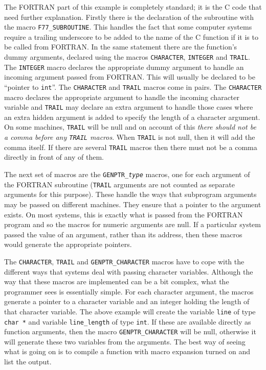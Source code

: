 \documentclass[twoside,11pt,nolof]{starlink}
\begin{document}
The FORTRAN part of this example is completely standard; it is the C code that
need further explanation. Firstly there is the declaration of the subroutine
with the macro \texttt{F77\_SUBROUTINE}\@.
This handles the fact that some computer
systems require a trailing underscore to be added to the name of the C function
if it is to be called from FORTRAN\@. In the same statement there are the
function's dummy arguments, declared using the macros \texttt{CHARACTER},
\texttt{INTEGER} and \texttt{TRAIL}\@.
The \texttt{INTEGER} macro declares the appropriate dummy argument to handle an
incoming argument passed from FORTRAN\@. This will usually be declared to be
``pointer to \texttt{int}''. The \texttt{CHARACTER} and \texttt{TRAIL} macros
come in pairs.
The \texttt{CHARACTER} macro declares the appropriate argument to handle the
incoming character variable and \texttt{TRAIL} may declare an extra argument
to handle those
cases where an extra hidden argument is added to specify the length of a
character argument. On some machines, \texttt{TRAIL} will be null and on
account of this
\emph{there should not be a comma before any \texttt{TRAIL} macros}.
When \texttt{TRAIL} is not
null, then it will add the comma itself. If there are several \texttt{TRAIL}
macros then there must not be a comma directly in front of any of them.

The next set of macros are the \texttt{GENPTR\_\textit{type}}\/ macros, one
for each argument of the FORTRAN subroutine (\texttt{TRAIL} arguments are not
counted as separate arguments for this purpose).
These handle the ways that subprogram arguments
may be passed on different machines. They ensure that a pointer to the argument
exists. On most systems, this is exactly what is passed from the FORTRAN
program and so the macros for numeric arguments are null. If a particular
system passed the value of an argument, rather than its address, then these
macros would generate the appropriate pointers.

The \texttt{CHARACTER}, \texttt{TRAIL} and \texttt{GENPTR\_CHARACTER} macros
have to cope with the different ways that systems deal with passing character
variables. Although the
way that these macros are implemented can be a bit complex, what the programmer
sees is essentially simple. For each character argument, the macros generate a
pointer to a character variable and an integer holding the length of that
character variable. The above example will create the variable \texttt{line} of
type \texttt{char *} and variable \texttt{line\_length} of type \texttt{int}.
If these are available directly as function arguments, then the macro
\texttt{GENPTR\_CHARACTER} will be null, otherwise it will generate these two
variables from the arguments.
The best way of seeing what is going on is to compile a
function with macro expansion turned on and list the output.
\end{document}
